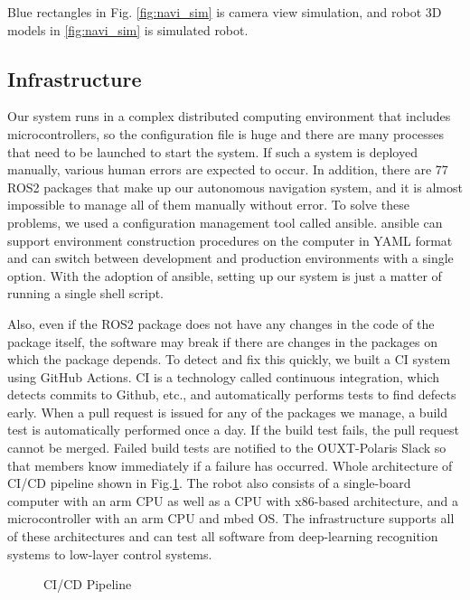 \documentclass[lettersize,journal]{IEEEtran}
\begin{document}
Blue rectangles in Fig. \ref{fig:navi_sim} is camera view simulation, and robot 3D models in \ref{fig:navi_sim} is simulated robot.

\subsection{Infrastructure}
Our system runs in a complex distributed computing environment that includes microcontrollers,
so the configuration file is huge and there are many processes that need to be launched to start the system.
If such a system is deployed manually, various human errors are expected to occur.
In addition, there are 77 ROS2 packages that make up our autonomous navigation system,
and it is almost impossible to manage all of them manually without error.
To solve these problems, we used a configuration management tool called ansible.
ansible can support environment construction procedures on the computer in YAML format and
can switch between development and production environments with a single option.
With the adoption of ansible, setting up our system is just a matter of running a single shell script.

Also, even if the ROS2 package does not have any changes in the code of the package itself,
the software may break if there are changes in the packages on which the package depends.
To detect and fix this quickly, we built a CI system using GitHub Actions.
CI is a technology called continuous integration, which detects commits to Github, etc.,
and automatically performs tests to find defects early.
When a pull request is issued for any of the packages we manage, a build test is automatically performed once a day.
If the build test fails, the pull request cannot be merged.
Failed build tests are notified to the OUXT-Polaris Slack so that members know immediately if a failure has occurred.
Whole architecture of CI/CD pipeline shown in Fig.\ref{fig:ci_cd_pipeline}.
The robot also consists of a single-board computer with an arm CPU as well as a CPU with x86-based architecture,
and a microcontroller with an arm CPU and mbed OS.
The infrastructure supports all of these architectures and 
can test all software from deep-learning recognition systems to low-layer control systems.

\begin{figure}[H]
    \begin{center}
  \end{center}
  \caption{CI/CD Pipeline}
  \label{fig:ci_cd_pipeline}
\end{figure}
\end{document}
